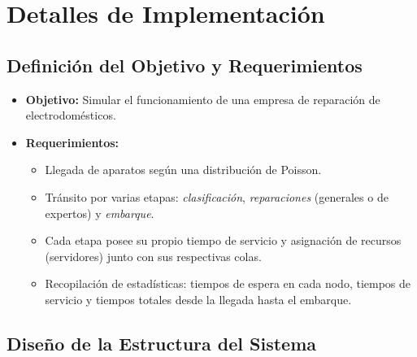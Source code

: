 \documentclass[a4paper,12pt]{article}
\begin{document}
\section{Detalles de Implementación}

\subsection{Definición del Objetivo y Requerimientos}

\begin{itemize}[leftmargin=2cm]
    \item \textbf{Objetivo:} Simular el funcionamiento de una empresa de reparación de electrodomésticos.
    \item \textbf{Requerimientos:}
    \begin{itemize}
        \item Llegada de aparatos según una distribución de Poisson.
        \item Tránsito por varias etapas: \emph{clasificación}, \emph{reparaciones} (generales o de expertos) y \emph{embarque}.
        \item Cada etapa posee su propio tiempo de servicio y asignación de recursos (servidores) junto con sus respectivas colas.
        \item Recopilación de estadísticas: tiempos de espera en cada nodo, tiempos de servicio y tiempos totales desde la llegada hasta el embarque.
    \end{itemize}
\end{itemize}

\subsection{Diseño de la Estructura del Sistema}
\end{document}
